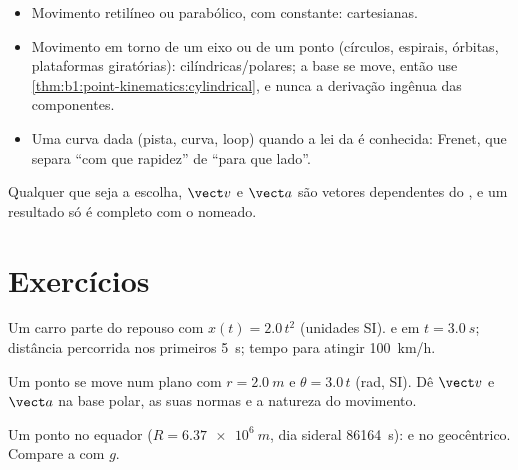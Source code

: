 \begin{method}\label{met:b1:point-kinematics:choose}
\begin{itemize}
  \item Movimento retilíneo ou parabólico, com  constante:
        cartesianas.
  \item Movimento em torno de um eixo ou de um ponto (círculos, espirais, órbitas,
        plataformas giratórias): cilíndricas/polares; a base se move, então use
        \cref{thm:b1:point-kinematics:cylindrical}, e nunca a derivação
        ingênua das componentes.
  \item Uma curva dada (pista, curva, loop) quando a lei da  é conhecida:
        Frenet, que separa ``com que rapidez'' de ``para que lado''.
\end{itemize}
Qualquer que seja a escolha, $\vect v$ e $\vect a$ são vetores dependentes
do , e um resultado só é completo com o  nomeado.
\end{method}

\section{Exercícios}

\begin{exercise}[$\star$]\label{exo:b1:point-kinematics:1}
Um carro parte do repouso com $x(t) = 2.0\,t^2$ (unidades SI).  e
 em $t = \qty{3.0}{s}$; distância percorrida nos primeiros
\qty{5}{s}; tempo para atingir \qty{100}{km/h}.
\end{exercise}

\begin{exercise}[$\star$]\label{exo:b1:point-kinematics:2}
Um ponto se move num plano com $r = \qty{2.0}{m}$ e $\theta = 3.0\,t$
(rad, SI). Dê $\vect v$ e $\vect a$ na base polar, as suas normas
e a natureza do movimento.
\end{exercise}

\begin{exercise}[$\star$]\label{exo:b1:point-kinematics:3}
Um ponto no equador ($R = \qty{6.37e6}{m}$, dia sideral
\qty{86164}{s}):  e  no  geocêntrico.
Compare a  com $g$.
\end{exercise}

